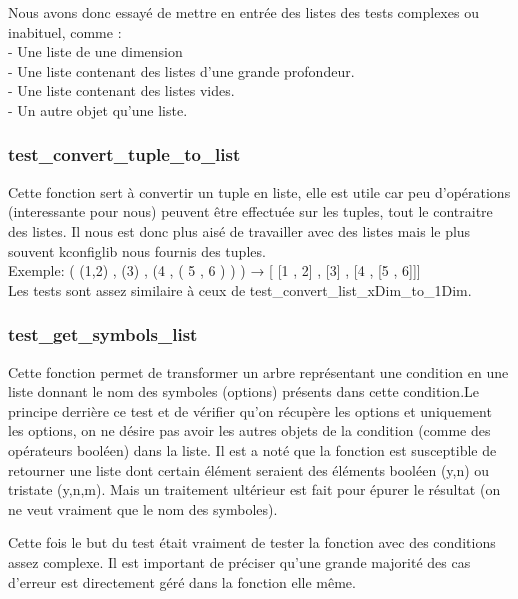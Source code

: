 \documentclass[16pts]{report}
\begin{document}
Nous avons donc essayé de mettre en entrée des listes des tests complexes ou 
inabituel, comme : \\

- Une liste de une dimension \\
- Une liste contenant des listes d'une grande profondeur. \\
- Une liste contenant des listes vides. \\
- Un autre objet qu'une liste. \\

\subsubsection{test_convert_tuple_to_list}

Cette fonction sert à convertir un tuple en liste, elle est utile car peu
d'opérations (interessante pour nous) peuvent être effectuée sur les tuples, tout le contraitre des 
listes. Il nous est donc plus aisé de travailler avec des listes mais le 
plus souvent kconfiglib nous fournis des tuples. \\

Exemple: ( (1,2) , (3) , (4 , ( 5 , 6 ) ) ) → [ [1 , 2] , [3] , [4 , [5 , 6]]] 
\\

Les tests sont assez similaire à ceux de test_convert_list_xDim_to_1Dim. \\


\subsubsection{test_get_symbols_list}

Cette fonction permet de transformer un arbre représentant une condition
en une liste donnant le nom des symboles (options) présents dans cette 
condition.Le principe derrière ce test et de vérifier qu'on récupère les 
options et uniquement les options, on ne désire pas avoir les autres objets 
de la condition (comme des opérateurs booléen) dans la liste.
Il est a noté que la fonction est susceptible de retourner une liste dont 
certain élément seraient des éléments booléen (y,n) ou tristate (y,n,m). 
Mais un traitement ultérieur est fait pour épurer le résultat (on ne 
veut vraiment que le nom des symboles).

Cette fois le but du test était vraiment de tester la fonction avec des 
conditions assez complexe. Il est important de préciser qu'une grande 
majorité des cas d'erreur est directement géré dans la fonction elle même.\\
\end{document}
